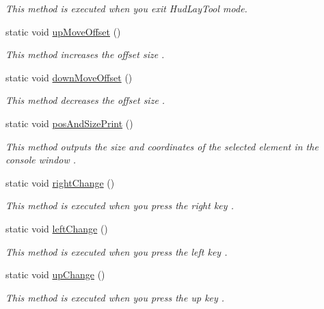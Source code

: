 \begin{DoxyCompactItemize}
\begin{DoxyCompactList}\small\item\em This method is executed when you exit Hud\+Lay\+Tool mode. \end{DoxyCompactList}\item 
static void \hyperlink{classkr_1_1ac_1_1kookmin_1_1cs_1_1tool_1_1_hud_layout_tool_a949f1c99b33700f0d9cd0d7dfbc5c42c}{up\+Move\+Offset} ()
\begin{DoxyCompactList}\small\item\em This method increases the offset size . \end{DoxyCompactList}\item 
static void \hyperlink{classkr_1_1ac_1_1kookmin_1_1cs_1_1tool_1_1_hud_layout_tool_afde0eaa3d268241650f7a8161379cebd}{down\+Move\+Offset} ()
\begin{DoxyCompactList}\small\item\em This method decreases the offset size . \end{DoxyCompactList}\item 
static void \hyperlink{classkr_1_1ac_1_1kookmin_1_1cs_1_1tool_1_1_hud_layout_tool_ae1d5a7dd1f95b43eb44b9bd1154b0eda}{pos\+And\+Size\+Print} ()
\begin{DoxyCompactList}\small\item\em This method outputs the size and coordinates of the selected element in the console window . \end{DoxyCompactList}\item 
static void \hyperlink{classkr_1_1ac_1_1kookmin_1_1cs_1_1tool_1_1_hud_layout_tool_aeb639c531b592fb5d8f69fb4e033b024}{right\+Change} ()
\begin{DoxyCompactList}\small\item\em This method is executed when you press the right key . \end{DoxyCompactList}\item 
static void \hyperlink{classkr_1_1ac_1_1kookmin_1_1cs_1_1tool_1_1_hud_layout_tool_ac91ce5f5908a457bde5f38a847058f1d}{left\+Change} ()
\begin{DoxyCompactList}\small\item\em This method is executed when you press the left key . \end{DoxyCompactList}\item 
static void \hyperlink{classkr_1_1ac_1_1kookmin_1_1cs_1_1tool_1_1_hud_layout_tool_aea6f75ea2479a569dfa99c849df7b435}{up\+Change} ()
\begin{DoxyCompactList}\small\item\em This method is executed when you press the up key . \end{DoxyCompactList}\item 

\end{DoxyCompactItemize}
